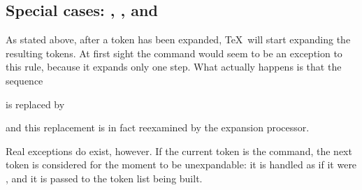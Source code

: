 \documentclass[letterpaper]{book}
\begin{document}
\subsection{Special cases: , , and }

As stated above,
after a token has been expanded, \TeX\ will start expanding
the resulting tokens. At first sight the 
command would seem to be an exception to this rule, because
it expands only one step. What actually happens is that
the sequence \begin{disp}\end{disp}
is replaced by 
\begin{disp}\end{disp}
and this replacement is in fact reexamined by the expansion
processor.

Real exceptions do exist, however. If the 
current token is the  command, the next
token is considered for the moment to be unexpandable:
it is handled as if it were , and it is
passed to the token list being built.
\end{document}
